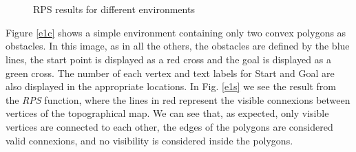 \documentclass[journal]{IEEEtran}
\begin{document}
\begin{figure}[p]
	~
	\\

	~
		
	\caption{RPS results for different environments}
	\label{fig:results}
\end{figure}

Figure \ref{e1c} shows a simple environment containing only two convex polygons as obstacles. In this image, as in all the others, the obstacles are defined by the blue lines, the start point is displayed as a red cross and the goal is displayed as a green cross. The number of each vertex and text labels for Start and Goal are also displayed in the appropriate locations. In Fig. \ref{e1s} we see the result from the \textit{RPS} function, where the lines in red represent the visible connexions between vertices of the topographical map. We can see that, as expected, only visible vertices are connected to each other, the edges of the polygons are considered valid connexions, and no visibility is considered inside the polygons.
\end{document}
